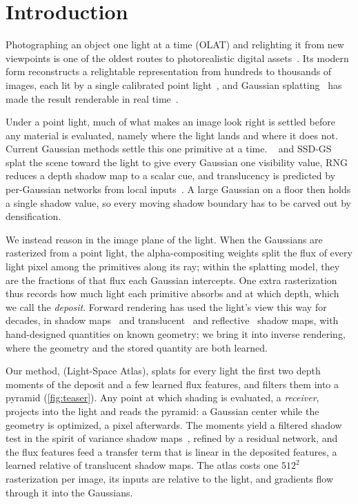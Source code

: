 \section{Introduction}
\label{sec:intro}

Photographing an object one light at a time (OLAT) and relighting it from new viewpoints is one of the oldest routes to photorealistic digital assets~\cite{debevec2000acquiring}.
Its modern form reconstructs a relightable representation from hundreds to thousands of images, each lit by a single calibrated point light~\cite{bi2020neural,zeng2023nrhints}, and Gaussian splatting~\cite{kerbl20233d} has made the result renderable in real time~\cite{bi2024gs3,kuang2024olat,fan2025rng,liu2025bigs,zheng2026ssdgs}.

Under a point light, much of what makes an image look right is settled before any material is evaluated, namely where the light lands and where it does not.
Current Gaussian methods settle this one primitive at a time.
\gsthree~\cite{bi2024gs3} and SSD-GS~\cite{zheng2026ssdgs} splat the scene toward the light to give every Gaussian one visibility value, RNG~\cite{fan2025rng} reduces a depth shadow map to a scalar cue, and translucency is predicted by per-Gaussian networks from local inputs~\cite{dihlmann2024sss,zheng2026ssdgs}.
A large Gaussian on a floor then holds a single shadow value, so every moving shadow boundary has to be carved out by densification.

We instead reason in the image plane of the light.
When the Gaussians are rasterized from a point light, the alpha-compositing weights split the flux of every light pixel among the primitives along its ray; within the splatting model, they are the fractions of that flux each Gaussian intercepts.
One extra rasterization thus records how much light each primitive absorbs and at which depth, which we call the \emph{deposit}.
Forward rendering has used the light's view this way for decades, in shadow maps~\cite{williams1978casting,donnelly2006variance,peters2015moment} and translucent~\cite{dachsbacher2003translucent} and reflective~\cite{dachsbacher2005reflective} shadow maps, with hand-designed quantities on known geometry; we bring it into inverse rendering, where the geometry and the stored quantity are both learned.

Our method, \ours (Light-Space Atlas), splats for every light the first two depth moments of the deposit and a few learned flux features, and filters them into a pyramid (\cref{fig:teaser}).
Any point at which shading is evaluated, a \emph{receiver}, projects into the light and reads the pyramid: a Gaussian center while the geometry is optimized, a pixel afterwards.
The moments yield a filtered shadow test in the spirit of variance shadow maps~\cite{donnelly2006variance}, refined by a residual network, and the flux features feed a transfer term that is linear in the deposited features, a learned relative of translucent shadow maps.
The atlas costs one $512^2$ rasterization per image, its inputs are relative to the light, and gradients flow through it into the Gaussians.

